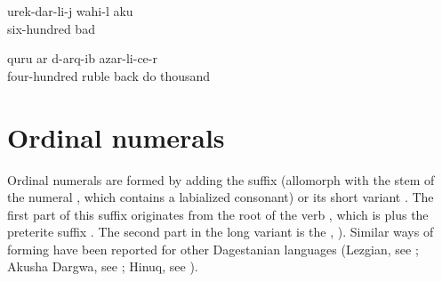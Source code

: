 %
\ea\label{ex:tobuyflourfor600}
\gll	urek-dar\pafr-li-j wahi-l ak\lmk u\\
	six-hundred bad \\
\glt	{}

\ex\label{ex:fromthe1000rubles}
 q\lmk uru{\pafr} \paaf ar d-arq\ej-ib azar-li-c\lmk e-r\\
	four-hundred ruble back do thousand\\
\glt	{}
\z




\section{Ordinal numerals}
\label{sec:ordinalnumerals}

Ordinal numerals are formed by adding the suffix  (allomorph  with the stem of the numeral , which contains a labialized consonant) or its short variant . The first part of this suffix originates from the root of the verb , which is \tit{-\glpl-} plus the preterite suffix . The second part  in the long variant is the  , ). Similar ways of forming  have been reported for other Dagestanian languages (\teg Lezgian, see \citealp[233]{Haspelmath1993}; Akusha Dargwa, see \citealp[30 fn.10]{vandenBerg2001}; Hinuq, see \citealp[401]{Forker2013a}).

